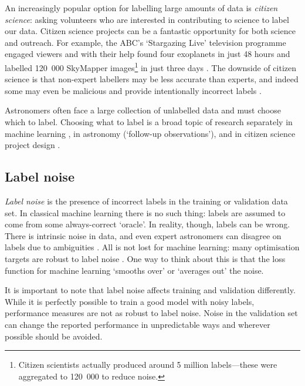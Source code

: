 \documentclass[11pt, a4paper]{book}
\newcommand{\defn}[1]{\emph{#1}}
\begin{document}
        An increasingly popular option for labelling large amounts of data is \defn{citizen science}: asking volunteers who are interested in contributing to science to label our data. Citizen science projects can be a fantastic opportunity for both science and outreach. For example, the ABC's `Stargazing Live' television programme engaged viewers and with their help found four exoplanets in just 48 hours \citep{miller_stargazing_2017} and labelled 120~000 SkyMapper images\footnote{Citizen scientists actually produced around 5 million labels---these were aggregated to 120~000 to reduce noise.} in just three days \citep{tucker_stargazing_2017}. The downside of citizen science is that non-expert labellers may be less accurate than experts, and indeed some may even be malicious and provide intentionally incorrect labels \citep{zhang_learning_2016}.

        Astronomers often face a large collection of unlabelled data and must choose which to label. Choosing what to label is a broad topic of research separately in machine learning \citep[often called active learning e.g.][]{gilyazev_active_2018}, in astronomy (`follow-up observations'), and in citizen science project design \citep[e.g. citizen science project Snapshot Serengeti found that showing volunteers \emph{uninteresting} images helped retain engagement;][]{sieland_snapshot_2015}.

    \subsection{Label noise}
    \label{sec:label-noise}

        \defn{Label noise} is the presence of incorrect labels in the training or validation data set. In classical machine learning there is no such thing: labels are assumed to come from some always-correct `oracle'. In reality, though, labels can be wrong. There is intrinsic noise in data, and even expert astronomers can disagree on labels due to ambiguities \citep[e.g. around 10 per cent of Radio Galaxy Zoo is extremely divisive amongst expert labellers;][]{banfield15}. All is not lost for machine learning: many optimisation targets are robust to label noise \citep{menon15cpe}. One way to think about this is that the loss function for machine learning `smooths over' or `averages out' the noise.

        It is important to note that label noise affects training and validation differently. While it is perfectly possible to train a good model with noisy labels, performance measures are not as robust to label noise. Noise in the validation set can change the reported performance in unpredictable ways and wherever possible should be avoided.
\end{document}
